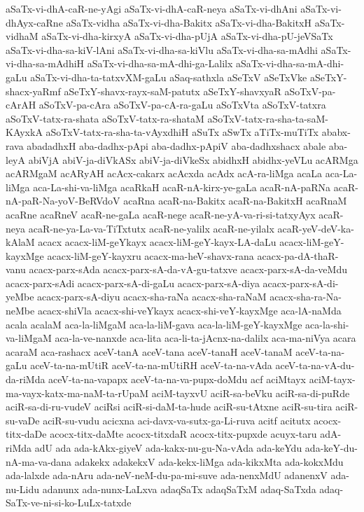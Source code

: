 {aSaTx-vi-dhA-caR-ne-yAgi
aSaTx-vi-dhA-caR-neya
aSaTx-vi-dhAni
aSaTx-vi-dhAyx-caRne
aSaTx-vidha
aSaTx-vi-dha-Bakitx
aSaTx-vi-dha-BakitxH
aSaTx-vidhaM
aSaTx-vi-dha-kirxyA
aSaTx-vi-dha-pUjA
aSaTx-vi-dha-pU-jeVSaTx
aSaTx-vi-dha-sa-kiV-lAni
aSaTx-vi-dha-sa-kiVlu
aSaTx-vi-dha-sa-mAdhi
aSaTx-vi-dha-sa-mAdhiH
aSaTx-vi-dha-sa-mA-dhi-ga-Lalilx
aSaTx-vi-dha-sa-mA-dhi-gaLu
aSaTx-vi-dha-ta-tatxvXM-gaLu
aSaq-sathxla
aSeTxV
aSeTxVke
aSeTxY-shacx-yaRmf
aSeTxY-shavx-rayx-saM-patutx
aSeTxY-shavxyaR
aSoTxV-pa-cArAH
aSoTxV-pa-cAra
aSoTxV-pa-cA-ra-gaLu
aSoTxVta
aSoTxV-tatxra
aSoTxV-tatx-ra-shata
aSoTxV-tatx-ra-shataM
aSoTxV-tatx-ra-sha-ta-saM-KAyxkA
aSoTxV-tatx-ra-sha-ta-vAyxdhiH
aSuTx
aSwTx
aTiTx-muTiTx
ababx-rava
abadadhxH
aba-dadhx-pApi
aba-dadhx-pApiV
aba-dadhxshacx
abale
aba-leyA
abiVjA
abiV-ja-diVkASx
abiV-ja-diVkeSx
abidhxH
abidhx-yeVLu
acARMga
acARMgaM
acARyAH
acAcx-cakarx
acAcxda
acAdx
acA-ra-liMga
acaLa
aca-La-liMga
aca-La-shi-va-liMga
acaRkaH
acaR-nA-kirx-ye-gaLa
acaR-nA-paRNa
acaR-nA-paR-Na-yoV-BeRVdoV
acaRna
acaR-na-Bakitx
acaR-na-BakitxH
acaRnaM
acaRne
acaRneV
acaR-ne-gaLa
acaR-nege
acaR-ne-yA-va-ri-si-tatxyAyx
acaR-neya
acaR-ne-ya-La-va-TiTxtutx
acaR-ne-yalilx
acaR-ne-yilalx
acaR-yeV-deV-ka-kAlaM
acacx
acacx-liM-geYkayx
acacx-liM-geY-kayx-LA-daLu
acacx-liM-geY-kayxMge
acacx-liM-geY-kayxru
acacx-ma-heV-shavx-rana
acacx-pa-dA-thaR-vanu
acacx-parx-sAda
acacx-parx-sA-da-vA-gu-tatxve
acacx-parx-sA-da-veMdu
acacx-parx-sAdi
acacx-parx-sA-di-gaLu
acacx-parx-sA-diya
acacx-parx-sA-di-yeMbe
acacx-parx-sA-diyu
acacx-sha-raNa
acacx-sha-raNaM
acacx-sha-ra-Na-neMbe
acacx-shiVla
acacx-shi-veYkayx
acacx-shi-veY-kayxMge
aca-lA-naMda
acala
acalaM
aca-la-liMgaM
aca-la-liM-gava
aca-la-liM-geY-kayxMge
aca-la-shi-va-liMgaM
aca-la-ve-nanxde
aca-lita
aca-li-ta-jAcnx-na-dalilx
aca-ma-niVya
acara
acaraM
aca-rashacx
aceV-tanA
aceV-tana
aceV-tanaH
aceV-tanaM
aceV-ta-na-gaLu
aceV-ta-na-mUtiR
aceV-ta-na-mUtiRH
aceV-ta-na-vAda
aceV-ta-na-vA-du-da-riMda
aceV-ta-na-vapapx
aceV-ta-na-va-pupx-doMdu
acf
aciMtayx
aciM-tayx-ma-vayx-katx-ma-naM-ta-rUpaM
aciM-tayxvU
aciR-sa-beVku
aciR-sa-di-puRde
aciR-sa-di-ru-vudeV
aciRsi
aciR-si-daM-ta-hude
aciR-su-tAtxne
aciR-su-tira
aciR-su-vaDe
aciR-su-vudu
acicxna
aci-davx-va-sutx-ga-Li-ruva
acitf
acitutx
acocx-titx-daDe
acocx-titx-daMte
acocx-titxdaR
acocx-titx-pupxde
acuyx-taru
adA-riMda
adU
ada
ada-kAkx-giyeV
ada-kakx-nu-gu-Na-vAda
ada-keYdu
ada-keY-du-nA-ma-va-dana
adakekx
adakekxV
ada-kekx-liMga
ada-kikxMta
ada-kokxMdu
ada-lalxde
ada-nAru
ada-neV-neM-du-pa-mi-suve
ada-nenxMdU
adanenxV
ada-nu-Lidu
adanunx
ada-nunx-LaLxva
adaqSaTx
adaqSaTxM
adaq-SaTxda
adaq-SaTx-ve-ni-si-ko-LuLx-tatxde
}
